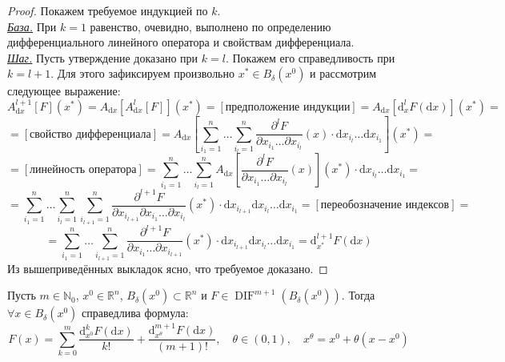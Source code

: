 \documentclass[11pt]{article}
\DeclareMathOperator{\DIF}{DIF}
\begin{document}
\begin{proof}
    Покажем требуемое индукцией по $k$. 
    \\
    \underline{\textit{База.}} При $k = 1$ равенство, очевидно, выполнено по определению дифференциального линейного оператора и свойствам дифференциала. 
    \\
    \underline{\textit{Шаг.}} Пусть утверждение доказано при $k = l$. Покажем его справедливость при $k = l + 1$. Для этого зафиксируем произвольно $x^{\ast} \in B_{\delta}\left(x^0\right)$ и рассмотрим следующее выражение:
    \[A_{\mathrm{d} x}^{l + 1} [F] \left(x^{\ast}\right) = A_{\mathrm{d} x} \left[A_{\mathrm{d} x}^l [F] \right] \left(x^{\ast}\right) = [\text{предположение индукции}] = A_{\mathrm{d} x} \left[\mathrm{d}_x^l F \left(\mathrm{d} x\right)\right] \left(x^{\ast}\right) = \]
    \[= [\text{свойство дифференциала}] = A_{\mathrm{d} x} \left[\sum_{i_1 = 1}^n \ldots \sum_{i_l = 1}^n \frac{\partial^l F}{\partial x_{i_1} \ldots \partial x_{i_l}} (x) \cdot \mathrm{d} x_{i_l} \ldots \mathrm{d} x_{i_1}\right] \left(x^{\ast}\right) = \]
    \[= [\text{линейность оператора}] = \sum_{i_1 = 1}^n \ldots \sum_{i_l = 1}^n A_{\mathrm{d} x} \left[\frac{\partial^l F}{\partial x_{i_1} \ldots \partial x_{i_l}} (x)\right] \left(x^{\ast}\right) \cdot \mathrm{d} x_{i_l} \ldots \mathrm{d} x_{i_1} = \]
    \[= \sum_{i_1 = 1}^n \ldots \sum_{i_l = 1}^n \sum_{i_{l + 1} = 1}^n \frac{\partial^{l + 1} F}{\partial x_{i_{l + 1}} \partial x_{i_1} \ldots \partial x_{i_l}} \left(x^{\ast}\right) \cdot \mathrm{d} x_{i_{l + 1}} \mathrm{d} x_{i_l} \ldots \mathrm{d} x_{i_1} = [\text{переобозначение индексов}] = \]
    \[= \sum_{i_1 = 1}^n \ldots \sum_{i_{l + 1} = 1}^n \frac{\partial^{l + 1} F}{\partial x_{i_1} \ldots \partial x_{i_{l + 1}}} \left(x^{\ast}\right) \cdot \mathrm{d} x_{i_{l + 1}} \mathrm{d} x_{i_l} \ldots \mathrm{d} x_{i_1} = \mathrm{d}_{x^{\ast}}^{l + 1} F (\mathrm{d} x)\]
    Из вышеприведённых выкладок ясно, что требуемое доказано.
\end{proof}

\begin{theorem}
    Пусть $m \in \mathbb{N}_0$, $x^0 \in \mathbb{R}^n$, $B_{\delta} \left(x^0\right) \subset \mathbb{R}^n$ и $F \in \DIF^{m + 1} \left(B_{\delta} \left(x^0\right) \right)$.
    Тогда $\forall x \in B_{\delta} \left(x^0\right)$ справедлива формула:
    \[F(x) = \sum_{k = 0}^m \frac{\mathrm{d}_{x^0}^k F (\mathrm{d} x)}{k !} + \frac{\mathrm{d}_{x^{\theta}}^{m + 1} F (\mathrm{d} x)}{(m + 1)!}, \quad \theta \in (0, 1), \quad x^{\theta} = x^0 + \theta \left(x - x^0\right)\]
\end{theorem}
\end{document}
